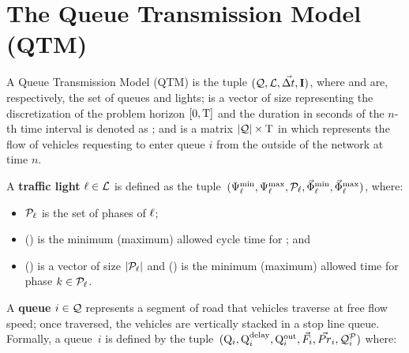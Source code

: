 \section{The Queue Transmission Model (QTM)}



A Queue Transmission Model (QTM) is the tuple $(\mathcal{Q}, \mathcal{L}, \vec{\Delta t}, \mathbf{I})$,
where \Qset and \Lset are, respectively, the set of queues and lights;
%
\vecDT is a vector of size \Nn representing the  discretization of the problem
horizon $[0,\mathrm{T}]$ and the duration in seconds of the $n$-th time interval is
denoted as \DT[n];
%
%
and \MatQIN is a matrix $|\mathcal{Q}| \times \mathrm{T}$ in which  represents
the flow of vehicles requesting to enter queue $i$ from the outside of the network
at time $n$.



A \textbf{traffic light} $\ell \in \mathcal{L}$ is defined as the tuple~$(\mathrm{\Psi}_{\ell}^{\mathrm{min}},
\mathrm{\Psi}_{\ell}^{\mathrm{max}}, \mathcal{P}_\ell, \vec{\mathrm{\Phi}}_{\ell}^{\mathrm{min}}, \vec{\mathrm{\Phi}}_{\ell}^{\mathrm{max}})$, where:

\begin{itemize}
%
\item $\mathcal{P}_\ell$ is the set of phases of $\ell$;
%
\item \CTMIN{\tl} (\CTMAX{\tl}) is the minimum (maximum) allowed cycle time for
  \tl; and
%
\item \VecPTMIN{\tl} (\VecPTMAX{\tl}) is a vector of size $|\mathcal{P}_\ell|$ and
   () is the minimum (maximum) allowed time for
  phase $k \in \mathcal{P}_\ell$. 
%
\end{itemize}


A \textbf{queue} $i \in \mathcal{Q}$ represents a segment of road that vehicles
traverse at free flow speed; once traversed, the vehicles are vertically stacked
in a stop line queue.
%
Formally, a queue~$i$ is defined by the tuple~$(\mathrm{Q}_{i}, \mathrm{Q}_{i}^{\mathrm{delay}}, \mathrm{Q}_{i}^{\mathrm{out}},
\vec{F}_i, \vec{Pr}_i, \mathcal{Q}_{i}^{\mathcal{P}})$ where:

